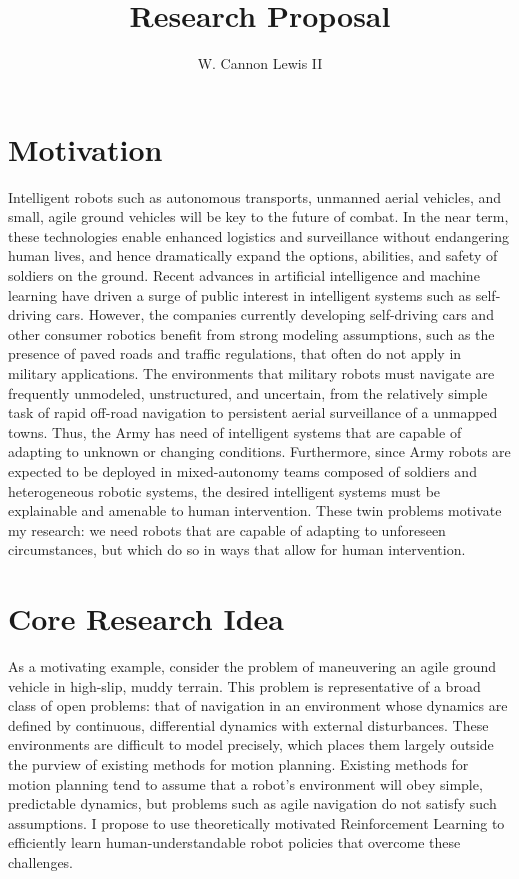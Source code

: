\documentclass[10pt]{article}
\begin{document}
\thispagestyle{empty}

\title{Research Proposal}
\author{W. Cannon Lewis II}

\maketitle

\section*{Motivation}

Intelligent robots such as autonomous transports, unmanned aerial vehicles,
and small, agile ground vehicles will be key to the future of combat. In the
near term, these technologies enable enhanced logistics and surveillance without
endangering human lives, and hence dramatically expand the options, abilities,
and safety of soldiers on the ground. Recent advances in artificial intelligence
and machine learning have driven a surge of public interest in intelligent
systems such as self-driving cars. However, the companies currently developing
self-driving cars and other consumer robotics benefit from strong modeling
assumptions, such as the presence of paved roads and traffic regulations, that
often do not apply in military applications. The environments that military
robots must navigate are frequently unmodeled, unstructured, and uncertain, from
the relatively simple task of rapid off-road navigation to persistent
aerial surveillance of a unmapped towns. Thus, the Army has need of intelligent
systems that are capable of adapting to unknown or changing conditions.
Furthermore, since Army robots are expected to be deployed in mixed-autonomy
teams composed of soldiers and heterogeneous robotic systems,
the desired intelligent systems must be explainable and amenable to human
intervention. These twin problems motivate my research: we need robots that are
capable of adapting to unforeseen circumstances, but which do so in ways that
allow for human intervention.

\section*{Core Research Idea}
As a motivating example, consider the problem of maneuvering an agile ground
vehicle in high-slip, muddy terrain. This problem is representative of a broad
class of open problems: that of navigation in an environment whose dynamics are
defined by continuous, differential dynamics with external disturbances. These
environments are difficult to model precisely, which places them largely outside
the purview of existing methods for motion planning.
Existing methods for motion planning tend to assume that a robot's environment
will obey simple, predictable dynamics, but problems such as agile navigation do
not satisfy such assumptions. I propose to use theoretically motivated
Reinforcement Learning to efficiently learn human-understandable robot policies
that overcome these challenges.
\end{document}
